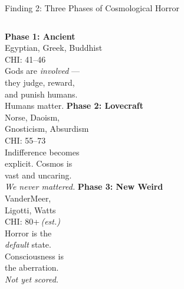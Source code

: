\documentclass[10pt, aspectratio=169]{beamer}
\begin{document}
\begin{frame}{Finding 2: Three Phases of Cosmological Horror}
  \vspace{0.6em}
  \begin{columns}[T]
      \textbf{\textcolor{lowchi}{Phase 1: Ancient}}\\[0.3em]
      \small
      Egyptian, Greek, Buddhist\\[0.2em]
      CHI: 41--46\\[0.2em]
      Gods are \textit{involved} —\\
      they judge, reward,\\
      and punish humans.\\[0.2em]
      Humans matter.
      \textbf{\textcolor{midchi}{Phase 2: Lovecraft}}\\[0.3em]
      \small
      Norse, Daoism,\\
      Gnosticism, Absurdism\\[0.2em]
      CHI: 55--73\\[0.2em]
      Indifference becomes\\
      explicit. Cosmos is\\
      vast and uncaring.\\[0.2em]
      \textit{We never mattered.}
      \textbf{\textcolor{lovecraftred}{Phase 3: New Weird}}\\[0.3em]
      \small
      VanderMeer,\\
      Ligotti, Watts\\[0.2em]
      CHI: 80+\,\textit{(est.)}\\[0.2em]
      Horror is the\\
      \textit{default} state.\\
      Consciousness is\\
      the aberration.\\[0.2em]
      \textit{Not yet scored.}
  \end{columns}
\end{frame}
\end{document}
